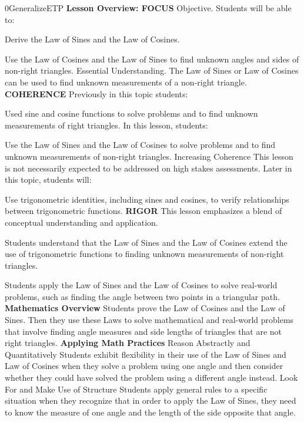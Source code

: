 \documentclass{article}
\newenvironment{te-addendum}[2]{}{}     %
\newcommand{\te}[1]{}                   %
\begin{document}
\begin{te-addendum}{0}{GeneralizeETP}
\textbf{Lesson Overview: FOCUS}
Objective. Students will be able to:
\item Derive the Law of Sines and the Law of Cosines.
\item Use the Law of Cosines and the Law of Sines to find unknown angles and sides of non-right triangles.
Essential Understanding. The Law of Sines or Law of Cosines can be used to find unknown measurements of a non-right triangle.
\textbf{COHERENCE}
Previously in this topic students:
\item Used sine and cosine functions to solve problems and to find unknown measurements of right triangles.
In this lesson, students:
\item Use the Law of Sines and the Law of Cosines to solve problems and to find unknown measurements of non-right triangles.
Increasing Coherence This lesson is not necessarily expected to be addressed on high stakes assessments.
Later in this topic, students will:
\item Use trigonometric identities, including sines and cosines, to verify relationships between trigonometric functions.
\textbf{RIGOR}
This lesson emphasizes a blend of conceptual understanding and application.
\item Students understand that the Law of Sines and the Law of Cosines extend the use of trigonometric functions to finding unknown measurements of non-right triangles.
\item Students apply the Law of Sines and the Law of Cosines to solve real-world problems, such as finding the angle between two points in a triangular path.
\textbf{Mathematics Overview}
Students prove the Law of Cosines and the Law of Sines. Then they use these Laws to solve mathematical and real-world problems that involve finding angle measures and side lengths of triangles that are not right triangles.
\textbf{Applying Math Practices}
Reason Abstractly and Quantitatively
Students exhibit flexibility in their use of the Law of Sines and Law of Cosines when they solve a problem using one angle and then consider whether they could have solved the problem using a different angle instead.
Look For and Make Use of Structure
Students apply general rules to a specific situation when they recognize that in order to apply the Law of Sines, they need to know the measure of one angle and the length of the side opposite that angle.
\te{Program Resources. SavvasRealize.com.}
\end{te-addendum}
\end{document}
